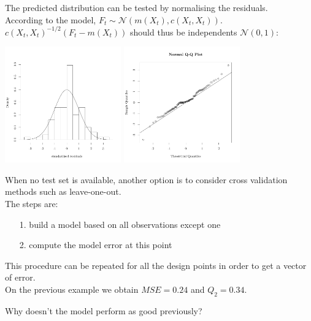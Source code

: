 \documentclass{beamer}
\begin{document}
\begin{frame}{}
The predicted distribution can be tested by normalising the residuals. \\ \vspace{3mm}
According to the model, $F_t \sim \mathcal{N}(m(X_t),c(X_t,X_t))$.\\ \vspace{3mm}
$c(X_t,X_t)^{-1/2}(F_t-m(X_t)) $ should thus be independents $\mathcal{N}(0,1)$:
\begin{center}
\includegraphics[height=5cm]{figures/R/VALID_hist} \qquad
\includegraphics[height=5cm]{figures/R/VALID_qqplot}
\end{center}
\end{frame}

\begin{frame}{}
When no test set is available, another option is to consider cross validation methods such as leave-one-out. \\ \vspace{5mm}
The steps are:
\begin{enumerate}
	\item[1.] build a model based on all observations except one
	\item[2.] compute the model error at this point
\end{enumerate}
This procedure can be repeated for all the design points in order to get a vector of error.\\ \vspace{3mm}
On the previous example we obtain $MSE = 0.24$ and $Q_2 = 0.34$. \\ \vspace{3mm} 
\begin{center}
Why doesn't the model perform as good previously?
\end{center}
\end{frame}
\end{document}
